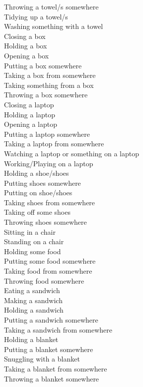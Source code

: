 \begin{multicols}{2}
Throwing a towel/s somewhere \\
Tidying up a towel/s \\
Washing something with a towel \\
Closing a box \\
Holding a box \\
Opening a box \\
Putting a box somewhere \\
Taking a box from somewhere \\
Taking something from a box \\
Throwing a box somewhere \\
Closing a laptop \\
Holding a laptop \\
Opening a laptop \\
Putting a laptop somewhere \\
Taking a laptop from somewhere \\
Watching a laptop or something on a laptop \\
Working/Playing on a laptop \\
Holding a shoe/shoes \\
Putting shoes somewhere \\
Putting on shoe/shoes \\
Taking shoes from somewhere \\
Taking off some shoes \\
Throwing shoes somewhere \\
Sitting in a chair \\
Standing on a chair \\
Holding some food \\
Putting some food somewhere \\
Taking food from somewhere \\
Throwing food somewhere \\
Eating a sandwich \\
Making a sandwich \\
Holding a sandwich \\
Putting a sandwich somewhere \\
Taking a sandwich from somewhere \\
Holding a blanket \\
Putting a blanket somewhere \\
Snuggling with a blanket \\
Taking a blanket from somewhere \\
Throwing a blanket somewhere \\

\end{multicols}
